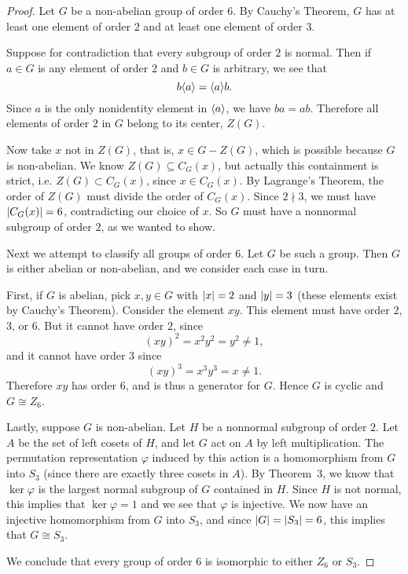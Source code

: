 \begin{proof}
  Let $G$ be a non-abelian group of order $6$. By Cauchy's Theorem,
  $G$ has at least one element of order $2$ and at least one element
  of order $3$.

  Suppose for contradiction that every subgroup of
  order $2$ is normal. Then if $a\in G$ is any element of order $2$
  and $b\in G$ is arbitrary, we see that
  \begin{equation*}
    b\langle{a}\rangle = \langle{a}\rangle b.
  \end{equation*}
  Since $a$ is the only nonidentity element in $\langle{a}\rangle$, we have
  $ba = ab$. Therefore all elements of order $2$ in $G$ belong to its
  center, $Z(G)$.

  Now take $x$ not in $Z(G)$, that is, $x\in G - Z(G)$, which is
  possible because $G$ is non-abelian. We know $Z(G)\subseteq C_G(x)$,
  but actually this containment is strict, i.e. $Z(G)\subset C_G(x)$,
  since $x\in C_G(x)$. By Lagrange's Theorem, the order of $Z(G)$ must
  divide the order of $C_G(x)$. Since $2\nmid3$, we must have
  $\lvert{C_G(x)}\rvert = 6$, contradicting our choice of $x$. So $G$ must
  have a nonnormal subgroup of order $2$, as we wanted to show.

  Next we attempt to classify all groups of order $6$. Let $G$ be such
  a group. Then $G$ is either abelian or non-abelian, and we consider
  each case in turn.

  First, if $G$ is abelian, pick $x,y\in G$ with $\lvert{x}\rvert = 2$ and
  $\lvert{y}\rvert = 3$ (these elements exist by Cauchy's Theorem). Consider
  the element $xy$. This element must have order $2$, $3$, or $6$. But
  it cannot have order $2$, since
  \begin{equation*}
    (xy)^2 = x^2y^2 = y^2 \neq 1,
  \end{equation*}
  and it cannot have order $3$ since
  \begin{equation*}
    (xy)^3 = x^3y^3 = x \neq 1.
  \end{equation*}
  Therefore $xy$ has order $6$, and is thus a generator for $G$. Hence
  $G$ is cyclic and $G\cong Z_6$.

  Lastly, suppose $G$ is non-abelian. Let $H$ be a nonnormal subgroup
  of order $2$. Let $A$ be the set of left cosets of $H$, and let $G$
  act on $A$ by left multiplication. The permutation representation
  $\varphi$ induced by this action is a homomorphism from $G$ into
  $S_3$ (since there are exactly three cosets in $A$). By Theorem~3,
  we know that $\ker\varphi$ is the largest normal subgroup of $G$
  contained in $H$. Since $H$ is not normal, this implies that
  $\ker\varphi = 1$ and we see that $\varphi$ is injective. We now
  have an injective homomorphism from $G$ into $S_3$, and since
  $\lvert{G}\rvert = \lvert{S_3}\rvert = 6$, this implies that $G\cong S_3$.

  We conclude that every group of order $6$ is isomorphic to either
  $Z_6$ or $S_3$.
\end{proof}

